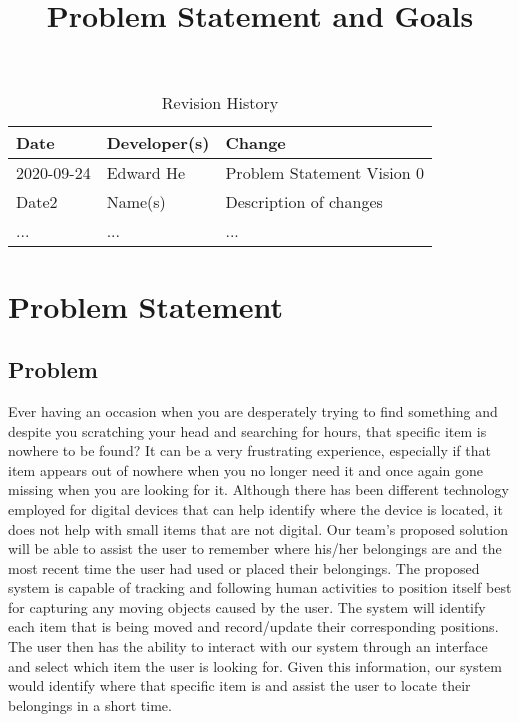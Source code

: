 \documentclass{article}
\title{Problem Statement and Goals\\\progname}
\author{\authname}
\date{}
\begin{document}
\maketitle

\begin{table}[hp]
\caption{Revision History} \label{TblRevisionHistory}
\begin{tabularx}{\textwidth}{llX}
\toprule
\textbf{Date} & \textbf{Developer(s)} & \textbf{Change}\\
\midrule
2020-09-24 & Edward He & Problem Statement Vision 0\\
Date2 & Name(s) & Description of changes\\
... & ... & ...\\
\bottomrule
\end{tabularx}
\end{table}

\section{Problem Statement}


\subsection{Problem}
Ever having an occasion when you are desperately trying to find something and despite you scratching your head and searching for hours, that specific item is nowhere to be found? It can be a very frustrating experience, especially if that item appears out of nowhere when you no longer need it and once again gone missing when you are looking for it. Although there has been different technology employed for digital devices that can help identify where the device is located, it does not help with small items that are not digital. Our team's proposed solution will be able to assist the user to remember where his/her belongings are and the most recent time the user had used or placed their belongings. The proposed system is capable of tracking and following human activities to position itself best for capturing any moving objects caused by the user. The system will identify each item that is being moved and record/update their corresponding positions. The user then has the ability to interact with our system through an interface and select which item the user is looking for. Given this information, our system would identify where that specific item is and assist the user to locate their belongings in a short time. 
\end{document}
